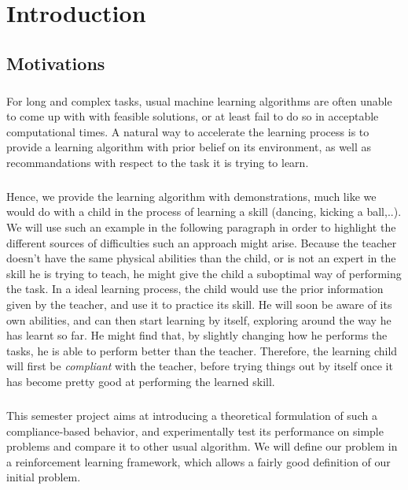 \documentclass[a4paper]{report}
\begin{document}
	
	
	\tableofcontents
	
	\chapter{Introduction}
	{
		\section{Motivations}
		{
			\paragraph{} For long and complex tasks, usual machine learning algorithms are often unable to come up with with feasible solutions, or at least fail to do so in acceptable computational times. A natural way to accelerate the learning process is to provide a learning algorithm with prior belief on its environment, as well as recommandations with respect to the task it is trying to learn. 
			
			\paragraph{} Hence, we provide the learning algorithm with demonstrations, much like we would do with a child in the process of learning a skill (dancing, kicking a ball,..). We will use such an example in the following paragraph in order to highlight the different sources of difficulties such an approach might arise.\newline
			Because the teacher doesn't have the same physical abilities than the child, or is not an expert in the skill he is trying to teach, he might give the child a suboptimal way of performing the task. In a ideal learning process, the child would use the prior information given by the teacher, and use it to practice its skill. He will soon be aware of its own abilities, and can then start learning by itself, exploring around the way he has learnt so far. He might find that, by slightly changing how he performs the tasks,  he is able to perform better than the teacher. Therefore, the learning child will first be \emph{compliant} with the teacher, before trying things out by itself once it has become pretty good at performing the learned skill. 
			
			\paragraph{} This semester project aims at introducing a theoretical formulation of such a compliance-based behavior, and experimentally test its performance on simple problems and compare it to other usual algorithm. We will define our problem in a reinforcement learning framework, which allows a fairly good definition of our initial problem. 
			
}}
\end{document}
